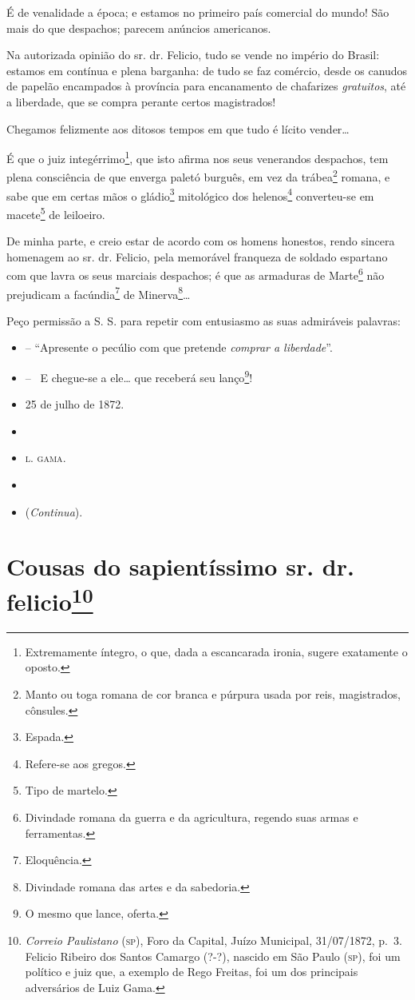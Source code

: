 É de venalidade a época; e estamos no primeiro país comercial do mundo!
São mais do que despachos; parecem anúncios americanos.

Na autorizada opinião do sr. dr. Felicio, tudo se vende no império do
Brasil: estamos em contínua e plena barganha: de tudo se faz comércio,
desde os canudos de papelão encampados à província para encanamento de
chafarizes \emph{gratuitos}, até a liberdade, que se compra perante
certos magistrados!

Chegamos felizmente aos ditosos tempos em que tudo é lícito vender\ldots{}

É que o juiz integérrimo\footnote{ Extremamente íntegro, o que, dada a
  escancarada ironia, sugere exatamente o oposto.}, que isto afirma nos
seus venerandos despachos, tem plena consciência de que enverga paletó
burguês, em vez da trábea\footnote{ Manto ou toga romana de cor branca
  e púrpura usada por reis, magistrados, cônsules.} romana, e sabe que
em certas mãos o gládio\footnote{ Espada.} mitológico dos
helenos\footnote{ Refere-se aos gregos.} converteu-se em
macete\footnote{ Tipo de martelo.} de leiloeiro.

De minha parte, e creio estar de acordo com os homens honestos, rendo
sincera homenagem ao sr. dr. Felicio, pela memorável franqueza de
soldado espartano com que lavra os seus marciais despachos; é que as
armaduras de Marte\footnote{ Divindade romana da guerra e da
  agricultura, regendo suas armas e ferramentas.} não prejudicam a
facúndia\footnote{ Eloquência.} de Minerva\footnote{ Divindade romana
  das artes e da sabedoria.}\ldots{}

Peço permissão a S. S. para repetir com entusiasmo as suas admiráveis
palavras:

\begin{itemize}
\item
  -- ``Apresente o pecúlio com que pretende \emph{comprar a liberdade}''.
\item
  -- ~E chegue-se a ele\ldots{} que receberá seu lanço\footnote{ O mesmo que
    lance, oferta.}!
\item
  25 de julho de 1872.
\item
\item
 \textsc{l. gama}.
\item
\item
  (\emph{Continua}).
\end{itemize}

\chapter{Cousas do sapientíssimo sr. dr. felicio\footnote{\emph{Correio Paulistano} (\textsc{sp}), Foro da Capital, Juízo
  Municipal, 31/07/1872, p.~3. Felicio Ribeiro dos Santos Camargo (?-?),
  nascido em São Paulo (\textsc{sp}), foi um político e juiz que, a exemplo de
  Rego Freitas, foi um dos principais adversários de Luiz Gama.}} %

